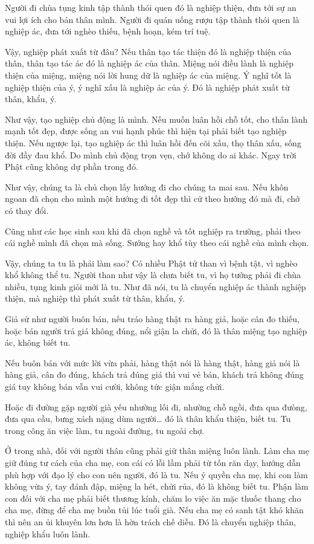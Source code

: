 \documentclass[
  12pt,
  oneside]{book}
\begin{document}
Người đi chùa tụng kinh tập thành thói quen đó là nghiệp thiện, đưa tới sự an vui lợi ích cho bản thân mình. Người đi quán uống rượu tập thành thói quen là nghiệp ác, đưa tới nghèo thiếu, bệnh hoạn, kém trí tuệ.

Vậy, nghiệp phát xuất từ đâu? Nếu thân tạo tác thiện đó là nghiệp thiện của thân, thân tạo tác ác đó là nghiệp ác của thân. Miệng nói điều lành là nghiệp thiện của miệng, miệng nói lời hung dữ là nghiệp ác của miệng. Ý nghĩ tốt là nghiệp thiện của ý, ý nghĩ xấu là nghiệp ác của ý. Đó là nghiệp phát xuất từ thân, khẩu, ý.

Như vậy, tạo nghiệp chủ động là mình. Nếu muốn luân hồi chỗ tốt, cho thân lành mạnh tốt đẹp, được sống an vui hạnh phúc thì hiện tại phải biết tạo nghiệp thiện. Nếu ngược lại, tạo nghiệp ác thì luân hồi đến cõi xấu, thọ thân xấu, sống đời đầy đau khổ. Do mình chủ động trọn vẹn, chớ không do ai khác. Ngay trời Phật cũng không dự phần trong đó.

Như vậy, chúng ta là chủ chọn lấy hướng đi cho chúng ta mai sau. Nếu khôn ngoan đã chọn cho mình một hướng đi tốt đẹp thì cứ theo hướng đó mà đi, chớ có thay đổi.

Cũng như các học sinh sau khi đã chọn nghề và tốt nghiệp ra trường, phải theo cái nghề mình đã chọn mà sống. Sướng hay khổ tùy theo cái nghề của mình chọn.

Vậy, chúng ta tu là phải làm sao? Có nhiều Phật tử than vì bệnh tật, vì nghèo khổ không thể tu. Người than như vậy là chưa biết tu, vì họ tưởng phải đi chùa nhiều, tụng kinh giỏi mới là tu. Như đã nói, tu là chuyển nghiệp ác thành nghiệp thiện, mà nghiệp thì phát xuất từ thân, khẩu, ý.

Giả sử như người buôn bán, nếu tráo hàng thật ra hàng giả, hoặc cân đo thiếu, hoặc bán người trả giá không đúng, nổi giận la chửi, đó là thân miệng tạo nghiệp ác, không biết tu.

Nếu buôn bán với mức lời vừa phải, hàng thật nói là hàng thật, hàng giả nói là hàng giả, cân đo đúng, khách trả đúng giá thì vui vẻ bán, khách trả không đúng giá tuy không bán vẫn vui cười, không tức giận mắng chửi.

Hoặc đi đường gặp người già yếu nhường lối đi, nhường chỗ ngồi, đưa qua đưòng, đưa qua cầu, bưng xách nặng dùm người\ldots{} đó là thân khẩu thiện, biết tu. Tu trong công ăn việc làm, tu ngoài đường, tu ngoài chợ.

Ở trong nhà, đối với người thân cũng phải giữ thân miệng luôn lành. Làm cha mẹ giữ đúng tư cách của cha mẹ, con cái có lỗi lầm phải từ tốn răn dạy, hướng dẫn phù hợp với đạo lý cho con nên người, đó là tu. Nếu ỷ quyền cha mẹ, khi con làm không vừa ý, tay đánh đập, miệng la hét, chửi rủa, đó là không biết tu. Phận làm con đối với cha mẹ phải biết thương kính, chăm lo việc ăn mặc thuốc thang cho cha mẹ, đừng để cha mẹ buồn tủi lúc tuổi già. Nếu cha mẹ có sanh tật khó khăn thì nên an ủi khuyên lơn hơn là hờn trách chế diễu. Đó là chuyển nghiệp thân, nghiệp khẩu luôn lành.
\end{document}
